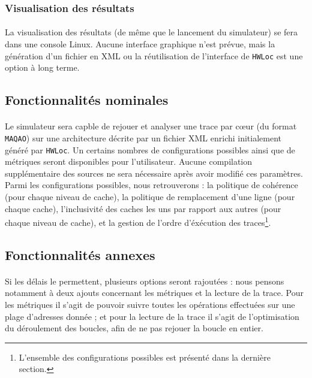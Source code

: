 \subsubsection{Visualisation des résultats}
\paragraph{}
La visualisation des résultats (de même que le lancement du simulateur) se fera dans une console Linux. Aucune interface graphique n'est prévue, mais la génération d'un fichier en XML ou la réutilisation de l'interface de \texttt{HWLoc} est une option à long terme.

\subsection{Fonctionnalités nominales}

\paragraph{}
Le simulateur sera capble de rejouer et analyser une trace par c\oe ur (du format \texttt{MAQAO}) sur une architecture décrite par un fichier XML enrichi initialement généré par \texttt{HWLoc}. Un certains nombres de configurations possibles ainsi que de métriques seront disponibles pour l'utilisateur. Aucune compilation supplémentaire des sources ne sera nécessaire après avoir modifié ces paramètres. Parmi les configurations possibles, nous retrouverons : la politique de cohérence (pour chaque niveau de cache), la politique de remplacement d'une ligne (pour chaque cache), l'inclusivité des caches les uns par rapport aux autres (pour chaque niveau de cache), et la gestion de l'ordre d'éxécution des traces\footnote{L'ensemble des configurations possibles est présenté dans la dernière section.}.

\subsection{Fonctionnalités annexes}

\paragraph{}
Si les délais le permettent, plusieurs options seront rajoutées : nous pensons notamment à deux ajouts concernant les métriques et la lecture de la trace. Pour les métriques il s'agit de pouvoir suivre toutes les opérations effectuées sur une plage d'adresses donnée ; et pour la lecture de la trace il s'agit de l'optimisation du déroulement des boucles, afin de ne pas rejouer la boucle en entier.
